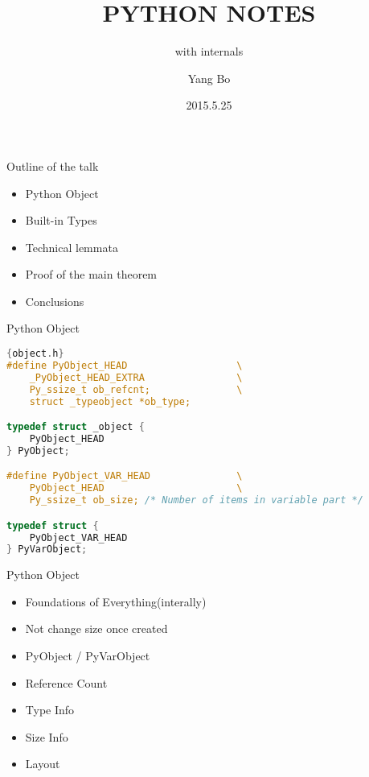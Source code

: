 \documentclass[xcolor=svgnames]{beamer}
\title{PYTHON NOTES}
\subtitle{with internals}
\author{Yang Bo}
\institute[Admaster]{
    RDBJ \\
    Admaster
}
\date{2015.5.25}
\begin{document}
\begin{frame}[plain]
  \titlepage
\end{frame}
\begin{frame}{Outline of the talk} 
 
\begin{itemize} 
  \item Python Object
  \pause
  \item Built-in Types 
  \pause 
  \item Technical lemmata 
  \pause 
  \item Proof of the main theorem 
  \pause 
  \item Conclusions 
\end{itemize} 
 
\end{frame} 

\begin{frame}[fragile]{Python Object}
    \begin{lstlisting}[language=C]{object.h}
#define PyObject_HEAD                   \
    _PyObject_HEAD_EXTRA                \
    Py_ssize_t ob_refcnt;               \
    struct _typeobject *ob_type;

typedef struct _object {
    PyObject_HEAD
} PyObject;

#define PyObject_VAR_HEAD               \
    PyObject_HEAD                       \
    Py_ssize_t ob_size; /* Number of items in variable part */

typedef struct {
    PyObject_VAR_HEAD
} PyVarObject;
\end{lstlisting} 
\end{frame}

\begin{frame}{Python Object}
  \begin{itemize}
    \item Foundations of Everything(interally)
    \item Not change size once created
    \item PyObject / PyVarObject
    \item Reference Count
    \item Type Info
    \item Size Info
    \item Layout
  \end{itemize}
\end{frame}
\end{document}
